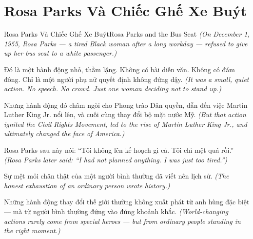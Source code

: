 \section{Rosa Parks Và Chiếc Ghế Xe Buýt}
\begin{truyen}{Rosa Parks Và Chiếc Ghế Xe Buýt}{Rosa Parks and the Bus Seat}
\textit{(On December 1, 1955, Rosa Parks — a tired Black woman after a long workday — refused to give up her bus seat to a white passenger.)}

Đó là một hành động nhỏ, thầm lặng. Không có bài diễn văn. Không có đám đông. Chỉ là một người phụ nữ quyết định không đứng dậy.
\textit{(It was a small, quiet action. No speech. No crowd. Just one woman deciding not to stand up.)}

Nhưng hành động đó châm ngòi cho Phong trào Dân quyền, dẫn đến việc Martin Luther King Jr. nổi lên, và cuối cùng thay đổi bộ mặt nước Mỹ.
\textit{(But that action ignited the Civil Rights Movement, led to the rise of Martin Luther King Jr., and ultimately changed the face of America.)}

Rosa Parks sau này nói: ``Tôi không lên kế hoạch gì cả. Tôi chỉ mệt quá rồi.''
\textit{(Rosa Parks later said: ``I had not planned anything. I was just too tired.'')}

Sự mệt mỏi chân thật của một người bình thường đã viết nên lịch sử.
\textit{(The honest exhaustion of an ordinary person wrote history.)}

\end{truyen}

\begin{baihoc}
Những hành động thay đổi thế giới thường không xuất phát từ anh hùng đặc biệt — mà từ người bình thường đứng vào đúng khoảnh khắc.
\textit{(World-changing actions rarely come from special heroes — but from ordinary people standing in the right moment.)}
\end{baihoc}
\ngancach


